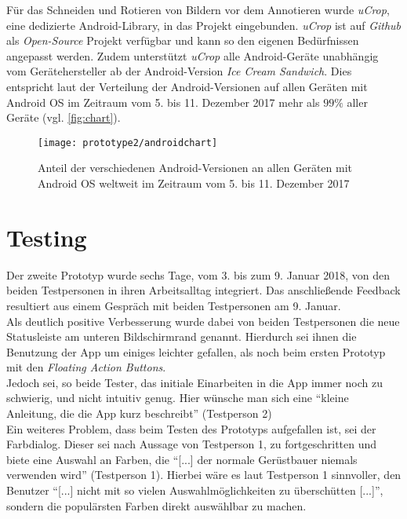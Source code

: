 Für das Schneiden und Rotieren von Bildern vor dem Annotieren wurde \emph{uCrop}, eine dedizierte Android-Library, in das Projekt eingebunden.
\emph{uCrop} ist auf \emph{Github} als \emph{Open-Source} Projekt verfügbar und kann so den eigenen Bedürfnissen angepasst werden. 
Zudem unterstützt \emph{uCrop} alle Android-Geräte unabhängig vom Gerätehersteller ab der Android-Version \emph{Ice Cream Sandwich}. 
Dies entspricht laut der Verteilung der Android-Versionen auf allen Geräten mit Android OS im Zeitraum vom 5. bis 11. Dezember 2017 mehr als $99\%$ aller Geräte (vgl. \autoref{fig:chart}).
\begin{figure}[h]
  \centering
  \texttt{[image: prototype2/androidchart]}
  \caption{Anteil der verschiedenen Android-Versionen an allen Geräten mit Android OS weltweit im Zeitraum vom 5. bis 11. Dezember 2017}
  \label{fig:chart}
\end{figure}

\section{Testing}\label{sec:test2}
Der zweite Prototyp wurde sechs Tage, vom 3. bis zum 9. Januar 2018, von den beiden Testpersonen in ihren Arbeitsalltag integriert.
Das anschließende Feedback resultiert aus einem Gespräch mit beiden Testpersonen am 9. Januar. \\

Als deutlich positive Verbesserung wurde dabei von beiden Testpersonen die neue Statusleiste am unteren Bildschirmrand genannt.
Hierdurch sei ihnen die Benutzung der App um einiges leichter gefallen, als noch beim ersten Prototyp mit den \emph{Floating Action Buttons}. \\

Jedoch sei, so beide Tester, das initiale Einarbeiten in die App immer noch zu schwierig, und nicht intuitiv genug.
Hier wünsche man sich eine ``kleine Anleitung, die die App kurz beschreibt'' (Testperson 2) \\

Ein weiteres Problem, dass beim Testen des Prototyps aufgefallen ist, sei der Farbdialog.
Dieser sei nach Aussage von Testperson 1, zu fortgeschritten und biete eine Auswahl an Farben, die ``[...] der normale Gerüstbauer niemals verwenden wird'' (Testperson 1).
Hierbei wäre es laut Testperson 1 sinnvoller, den Benutzer ``[...] nicht mit so vielen Auswahlmöglichkeiten zu überschütten [...]'', sondern die populärsten Farben direkt auswählbar zu machen. \\

